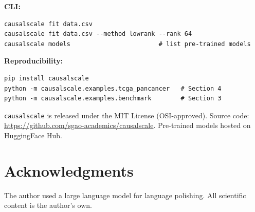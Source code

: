 \documentclass[11pt,twoside]{article}
\begin{document}
\noindent\textbf{CLI:}
\begin{verbatim}
causalscale fit data.csv
causalscale fit data.csv --method lowrank --rank 64
causalscale models                        # list pre-trained models
\end{verbatim}

\noindent\textbf{Reproducibility:}
\begin{verbatim}
pip install causalscale
python -m causalscale.examples.tcga_pancancer   # Section 4
python -m causalscale.examples.benchmark        # Section 3
\end{verbatim}

\texttt{causalscale} is released under the MIT License (OSI-approved).
Source code: \url{https://github.com/sgao-academics/causalscale}.
Pre-trained models hosted on HuggingFace Hub.

\section*{Acknowledgments}

The author used a large language model for language polishing. All scientific content is the author's own.

\newpage



\end{document}
